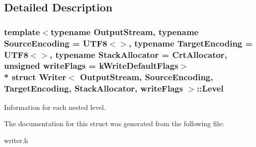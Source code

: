\subsection{Detailed Description}
\subsubsection*{template$<$typename Output\+Stream, typename Source\+Encoding = U\+T\+F8$<$$>$, typename Target\+Encoding = U\+T\+F8$<$$>$, typename Stack\+Allocator = Crt\+Allocator, unsigned write\+Flags = k\+Write\+Default\+Flags$>$\\*
struct Writer$<$ Output\+Stream, Source\+Encoding, Target\+Encoding, Stack\+Allocator, write\+Flags $>$\+::\+Level}

Information for each nested level. 

The documentation for this struct was generated from the following file\+:\begin{DoxyCompactItemize}
\item 
writer.\+h\end{DoxyCompactItemize}
